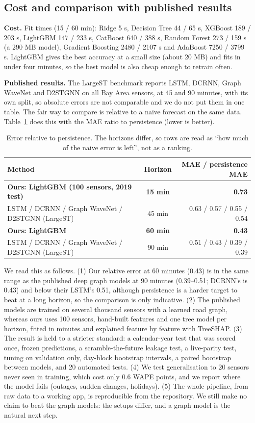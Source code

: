﻿\documentclass[11pt,a4paper]{article}
\begin{document}
\subsection{Cost and comparison with published results}
\textbf{Cost.} Fit times (15 / 60 min): Ridge 5 s, Decision Tree 44 / 65 s, XGBoost 189 / 203 s, LightGBM 147 / 233 s, CatBoost 640 / 388 s, Random Forest 273 / 159 s (a 290 MB model), Gradient Boosting 2480 / 2107 s and AdaBoost 7250 / 3799 s. LightGBM gives the best accuracy at a small size (about 20 MB) and fits in under four minutes, so the best model is also cheap enough to retrain often.

\textbf{Published results.} The LargeST benchmark \cite{largest} reports LSTM, DCRNN, Graph WaveNet \cite{gwnet} and D2STGNN \cite{d2stgnn} on all Bay Area sensors, at 45 and 90 minutes, with its own split, so absolute errors are not comparable and we do not put them in one table. The fair way to compare is relative to a naive forecast on the same data. Table~\ref{tab:pub} does this with the MAE ratio to persistence (lower is better).
\begin{table}[H]\centering\small
\begin{tabular}{lcr}
\toprule Method & Horizon & MAE / persistence MAE \\ \midrule
\textbf{Ours: LightGBM (100 sensors, 2019 test)} & \textbf{15 min} & \textbf{0.73} \\
LSTM / DCRNN / Graph WaveNet / D2STGNN (LargeST) & 45 min & 0.63 / 0.57 / 0.55 / 0.54 \\
\textbf{Ours: LightGBM} & \textbf{60 min} & \textbf{0.43} \\
LSTM / DCRNN / Graph WaveNet / D2STGNN (LargeST) & 90 min & 0.51 / 0.43 / 0.39 / 0.39 \\ \bottomrule
\end{tabular}
\caption{Error relative to persistence. The horizons differ, so rows are read as ``how much of the naive error is left'', not as a ranking.}\label{tab:pub}
\end{table}
We read this as follows. (1) Our relative error at 60 minutes (0.43) is in the same range as the published deep graph models at 90 minutes (0.39--0.51; DCRNN's is 0.43) and below their LSTM's 0.51, although persistence is a harder target to beat at a long horizon, so the comparison is only indicative. (2) The published models are trained on several thousand sensors with a learned road graph, whereas ours uses 100 sensors, hand-built features and one tree model per horizon, fitted in minutes and explained feature by feature with TreeSHAP. (3) The result is held to a stricter standard: a calendar-year test that was scored once, frozen predictions, a scramble-the-future leakage test, a live-parity test, tuning on validation only, day-block bootstrap intervals, a paired bootstrap between models, and 20 automated tests. (4) We test generalisation to 20 sensors never seen in training, which cost only 0.6 WAPE points, and we report where the model fails (outages, sudden changes, holidays). (5) The whole pipeline, from raw data to a working app, is reproducible from the repository. We still make no claim to beat the graph models: the setups differ, and a graph model is the natural next step.
\end{document}

